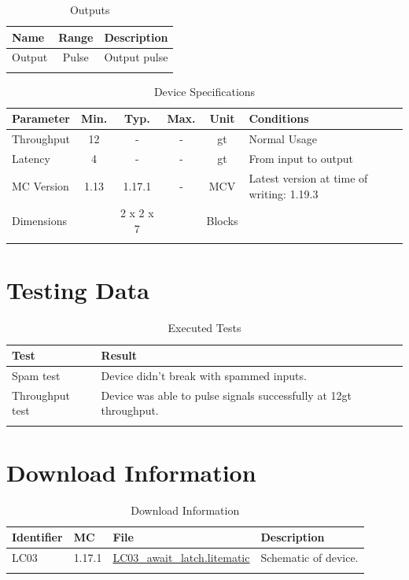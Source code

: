 \documentclass[10pt]{datasheet}
\begin{document}
\begin{table}[h]
    \caption{Outputs}
    \begin{tabularx}{\textwidth}{l | c | X}
        \thickhline
        \textbf{Name} & \textbf{Range} & \textbf{Description} \\
        \hline
        Output & Pulse & Output pulse \\
        \thickhline
\end{tabularx}
\end{table}

\begin{table}[h]
    \caption{Device Specifications}
    \begin{tabularx}{\textwidth}{l | c c c | c | X}
        \thickhline
        \textbf{Parameter} & \textbf{Min.} & \textbf{Typ.} & \textbf{Max.} &
        \textbf{Unit} & \textbf{Conditions} \\
        \hline
        Throughput  & 12 & - & - & gt & Normal Usage \\
        \hline
        Latency    & 4 & - & - & gt & From input to output \\
        \hline
        MC Version & 1.13 & 1.17.1 & - & MCV & Latest version at time of writing: 1.19.3\\
        \hline
        Dimensions & & 2 x 2 x 7 & & Blocks & \\
        \thickhline
\end{tabularx}
\end{table}
\newpage
\section{Testing Data}
\begin{table}[h]
\caption{Executed Tests}
\begin{tabularx}{\textwidth}{l | X}
    \thickhline
    \textbf{Test} & \textbf{Result} \\
    \hline
    Spam test & Device didn't break with spammed inputs. \\
    \hline
    Throughput test & Device was able to pulse signals successfully at 12gt throughput. \\
    \thickhline
\end{tabularx}
\end{table}

\section{Download Information}
\begin{table}[h]
    \caption{Download Information}
    \begin{tabularx}{\textwidth}{l | l | l | X}
        \thickhline
        \textbf{Identifier} & \textbf{MC} & \textbf{File} & \textbf{Description} \\
        \hline
        LC03 & 1.17.1 & \href{https://github.com/Soontech-Annals/Archive/blob/b56572c0d2b4f182d9e9d41449d8cb2963b923ae/Archive/logic-and-computation/LC03\%20Await\%20Latch/LC03\_await\_latch.litematic?raw=1}{LC03\_await\_latch.litematic} & Schematic of device. \\
        \hline
        \thickhline
    \end{tabularx}
\end{table}
\end{document}
